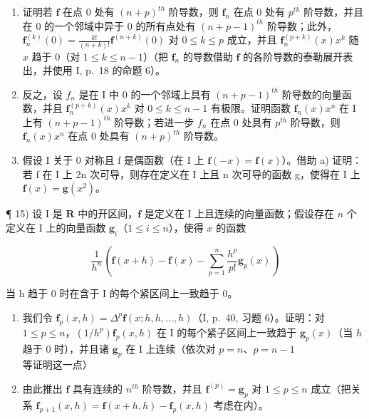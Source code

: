 \begin{enumerate}
\def\labelenumi{\alph{enumi})}
\item
  证明若 \(\mathbf{f}\) 在点 0 处有 \((n + p)^{th}\) 阶导数，则 \(\mathbf{f}_n\) 在点 0 处有 \(p^{th}\) 阶导数，并且在 0 的一个邻域中异于 0 的所有点处有 \((n + p - 1)^{th}\) 阶导数；此外，\(\mathbf{f}_n^{(k)}(0) = \frac{k!}{(n + k)!}\mathbf{f}^{(n + k)}(0)\) 对 \(0 \leqslant k \leqslant p\) 成立，并且 \(\mathbf{f}_n^{(p + k)}(x)x^k\) 随 \(x\) 趋于 0（对 \(1 \leqslant k \leqslant n - 1\)）（把 \(\mathbf{f}_n\) 的导数借助 \(\mathbf{f}\) 的各阶导数的泰勒展开表出，并使用 I, p.~18 的命题 6）。
\item
  反之，设 \(f_{n}\) 是在 I 中 0 的一个邻域上具有 \((n + p - 1)^{th}\) 阶导数的向量函数，并且 \(\mathbf{f}_{n}^{(p+k)}(x)x^{k}\) 对 \(0 \leqslant k \leqslant n - 1\) 有极限。证明函数 \(\mathbf{f}_{n}(x)x^{n}\) 在 I 上有 \((n + p - 1)^{th}\) 阶导数；若进一步 \(f_{n}\) 在点 0 处具有 \(p^{th}\) 阶导数，则 \(\mathbf{f}_{n}(x)x^{n}\) 在点 0 处具有 \((n + p)^{th}\) 阶导数。
\item
  假设 I 关于 0 对称且 f 是偶函数（在 I 上 \(\mathbf{f}(-x) = \mathbf{f}(x)\)）。借助 a) 证明：若 f 在 I 上 2n 次可导，则存在定义在 I 上且 n 次可导的函数 g，使得在 I 上 \(\mathbf{f}(x) = \mathbf{g}(x^{2})\)。
\end{enumerate}

¶ 15) 设 I 是 \(\mathbf{R}\) 中的开区间，\(\mathbf{f}\) 是定义在 I 上且连续的向量函数；假设存在 \(n\) 个定义在 I 上的向量函数 \(\mathbf{g}_i\)（\(1 \leqslant i \leqslant n\)），使得 \(x\) 的函数

\[
\frac {1}{h ^ {n}} \left(\mathbf {f} (x + h) - \mathbf {f} (x) - \sum_ {p = 1} ^ {n} \frac {h ^ {p}}{p !} \mathbf {g} _ {p} (x)\right)
\]

当 h 趋于 0 时在含于 I 的每个紧区间上一致趋于 0。

\begin{enumerate}
\def\labelenumi{\alph{enumi})}
\item
  我们令 \(\mathbf{f}_p(x,h) = \Delta^p\mathbf{f}(x;h,h,\ldots ,h)\)（I, p.~40, 习题 6）。证明：对 \(1\leqslant p\leqslant n\)，\((1 / h^{p})\mathbf{f}_{p}(x,h)\) 在 I 的每个紧子区间上一致趋于 \(\mathbf{g}_p(x)\)（当 \(h\) 趋于 0 时），并且诸 \(\mathbf{g}_p\) 在 I 上连续（依次对 \(p = n\)、\(p = n - 1\) 等证明这一点）
\item
  由此推出 \(\mathbf{f}\) 具有连续的 \(n^{th}\) 阶导数，并且 \(\mathbf{f}^{(p)} = \mathbf{g}_p\) 对 \(1 \leqslant p \leqslant n\) 成立（把关系 \(\mathbf{f}_{p+1}(x, h) = \mathbf{f}(x + h, h) - \mathbf{f}_p(x, h)\) 考虑在内）。
\end{enumerate}

